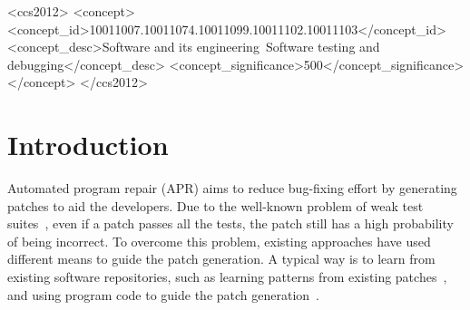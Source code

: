 \author{Zeyu Sun}

\author{Yuan-an Xiao}

\author{Wenjie Zhang}

\author{Kang Yuan}

\author{Yingfei Xiong}

\author{Lu Zhang}
\begin{CCSXML}
<ccs2012>
<concept>
<concept_id>10011007.10011074.10011099.10011102.10011103</concept_id>
<concept_desc>Software and its engineering~Software testing and debugging</concept_desc>
<concept_significance>500</concept_significance>
</concept>
</ccs2012>
\end{CCSXML}
\newcommand{\techname}{Recoder\xspace}

\maketitle

\section{Introduction}
Automated program repair (APR) aims to reduce bug-fixing effort by generating patches to aid the developers. Due to the well-known problem of weak test suites~\cite{PatchPlausibility}, even if a patch passes all the tests, the patch still has a high probability of being incorrect. To overcome this problem, existing approaches have used different means to guide the patch generation. A typical way is to learn from existing software repositories, such as learning patterns from existing patches~\cite{6606626,2018Shaping,jiang2019inferring,liu2019tbar,long2017automatic,bader2019getafix,DBLP:conf/icse/RolimSDPGGSH17}, and using program code to guide the patch generation~\cite{xiong2017precise,long2016automatic,2018Shaping,ELIXIR,xiong2018learning}. 

